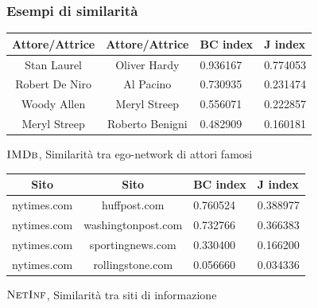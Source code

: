 \begin{frame}
	\frametitle{Esempi di similarità}
	
	\pause
	
	\centering
	\begin{table}[h]
		\centering
		\begin{tabular}{c|c|l|l}
			Attore/Attrice & Attore/Attrice  & BC index & J index \\ 
			\hline
			Stan Laurel    & Oliver Hardy    & 0.936167 & 0.774053 \\
			Robert De Niro & Al Pacino       & 0.730935 & 0.231474 \\
			Woody Allen    & Meryl Streep    & 0.556071 & 0.222857 \\
			Meryl Streep   & Roberto Benigni & 0.482909 & 0.160181 \\
		\end{tabular}
		\medskip
		
		$\textsc{IMDb}$, Similarità tra ego-network di attori famosi
	\end{table}
	
	\pause
	
	\begin{table}[h]
		\centering
		\begin{tabular}{c|c|l|l}
			Sito           & Sito            & BC index & J index \\ 
			\hline
			nytimes.com  & huffpost.com       & 0.760524 & 0.388977 \\
			nytimes.com  & washingtonpost.com & 0.732766 & 0.366383 \\
			nytimes.com  & sportingnews.com   & 0.330400 & 0.166200\\
			nytimes.com  & rollingstone.com   & 0.056660 & 0.034336 \\
		\end{tabular}
		\medskip
		
		$\textsc{NetInf}$, Similarità tra siti di informazione
	\end{table}
	
\end{frame}